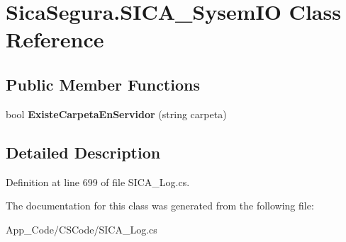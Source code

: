 \hypertarget{class_sica_segura_1_1_s_i_c_a___sysem_i_o}{}\section{Sica\+Segura.\+S\+I\+C\+A\+\_\+\+Sysem\+IO Class Reference}
\label{class_sica_segura_1_1_s_i_c_a___sysem_i_o}
\subsection*{Public Member Functions}
\begin{DoxyCompactItemize}
\item 
bool {\bfseries Existe\+Carpeta\+En\+Servidor} (string carpeta)\hypertarget{class_sica_segura_1_1_s_i_c_a___sysem_i_o_af852b64186eb239ff9d08b9734a1f569}{}\label{class_sica_segura_1_1_s_i_c_a___sysem_i_o_af852b64186eb239ff9d08b9734a1f569}

\end{DoxyCompactItemize}


\subsection{Detailed Description}


Definition at line 699 of file S\+I\+C\+A\+\_\+\+Log.\+cs.



The documentation for this class was generated from the following file\+:\begin{DoxyCompactItemize}
\item 
App\+\_\+\+Code/\+C\+S\+Code/S\+I\+C\+A\+\_\+\+Log.\+cs\end{DoxyCompactItemize}
